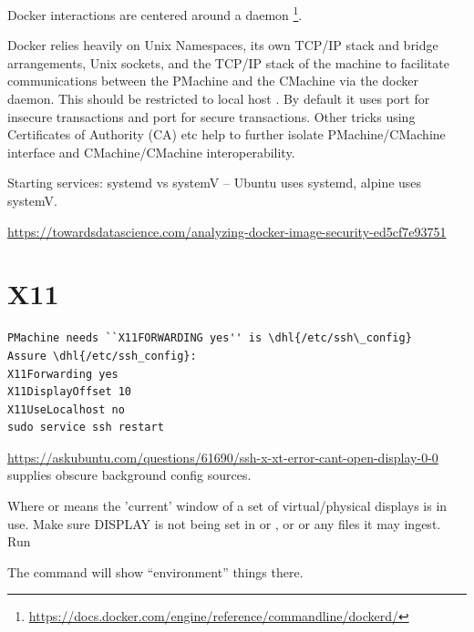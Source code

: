 \documentclass[letter,11pt,oneside]{article}
\newcommand{\ltodo}[2]{\marginpar{\textcolor{red}{ACTION: #1}\endnote{ACTION: #2}}}
\newcommand{\dhl}[1]{{\color{verbcolor}{\texttt#1}}}
\begin{document}
Docker interactions are centered around a daemon \dhl{dockerd}
\footnote{\url{https://docs.docker.com/engine/reference/commandline/dockerd/}}.

Docker relies heavily on Unix Namespaces, its own TCP/IP stack and
bridge arrangements, Unix sockets, and the TCP/IP stack of the machine
to facilitate communications between the PMachine and the CMachine via
the docker daemon. This should be restricted to local host
\dhl{127.0.0.1}. By default it uses port \dhl{2345} for insecure
transactions and port \dhl{2346} for secure transactions.  Other
tricks using Certificates of Authority (CA) etc help to further
isolate PMachine/CMachine interface and CMachine/CMachine
interoperability. 

Starting services: systemd vs systemV -- Ubuntu uses systemd, alpine
uses systemV.

\ltodo{flesh out systemd}{Get a crib together for this.}


\url{https://towardsdatascience.com/analyzing-docker-image-security-ed5cf7e93751}\
\section{X11}

\begin{tcolorbox} %
\begingroup \fontsize{10pt}{10pt}
\selectfont
\begin{verbatim} 
PMachine needs ``X11FORWARDING yes'' is \dhl{/etc/ssh\_config}
Assure \dhl{/etc/ssh_config}:
X11Forwarding yes
X11DisplayOffset 10
X11UseLocalhost no
sudo service ssh restart
\end{verbatim}
\endgroup
\end{tcolorbox}

\url{https://askubuntu.com/questions/61690/ssh-x-xt-error-cant-open-display-0-0}
supplies obscure background config sources.

Where \dhl{DISPLAY=0} or \dhl{DISPLAY=0.0} means the 'current' window
of a set of virtual/physical displays is in use.  Make sure DISPLAY is
not being set in \dhl{/etc/environment} or \dhl{/etc/bash.bashrc}, or
\dhl{~/.bash.rc} or any \dhl{alias} files it may ingest. Run
\dhl{env | grep DISPLAY}

The command \dhl{ssh -X user@machine env} will show ``environment''
things there.
\end{document}
